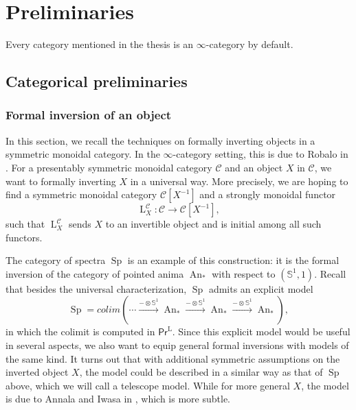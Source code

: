 \documentclass{article}
\theoremstyle{definition}
\newcommand{\on}{\operatorname}
\newcommand{\PrL}{\mathsf{Pr}^\mathrm{L} }
\begin{document}
\section{Preliminaries}\label{section:prelims}
Every category mentioned in the thesis is an $\infty$-category by default. 

\subsection{Categorical preliminaries}
\subsubsection{Formal inversion of an object}
In this section, we recall the techniques on formally inverting objects in a symmetric monoidal category. In the $\infty$-category setting, this is due to Robalo in \cite{Rob}. For a presentably symmetric monoidal category $\mathcal{C}$ and an object $X$ in $\mathcal{C}$, we want to formally inverting $X$ in a universal way. More precisely, we are hoping to find a symmetric monoidal category $\mathcal{C}[X^{-1}]$ and a strongly monoidal functor\[
\on{L}^{\mathcal{C}}_X: \mathcal{C}\rightarrow\mathcal{C}[X^{-1}],\]
such that $\on{L}^{\mathcal{C}}_X$ sends $X$ to an invertible object and is initial among all such functors.


The category of spectra $\on{Sp}$ is an example of this construction: it is the formal inversion of the category of pointed anima $\on{An}_\ast$ with respect to $(\mathbb{S}^1,1)$. Recall that besides the universal characterization, $\on{Sp}$ admits an explicit model\[
\on{Sp}=colim(\cdots\xrightarrow{-\otimes\mathbb{S}^1}\on{An}_\ast\xrightarrow{-\otimes\mathbb{S}^1}\on{An}_\ast\xrightarrow{-\otimes\mathbb{S}^1}\on{An}_\ast),\]
in which the colimit is computed in $\PrL$. Since this explicit model would be useful in several aspects, we also want to equip general formal inversions with models of the same kind. It turns out that with additional symmetric assumptions on the inverted object $X$, the model could be described in a similar way as that of $\on{Sp}$ above, which we will call a telescope model. While for more general $X$, the model is due to Annala and Iwasa in \cite{AI}, which is more subtle.
\end{document}
